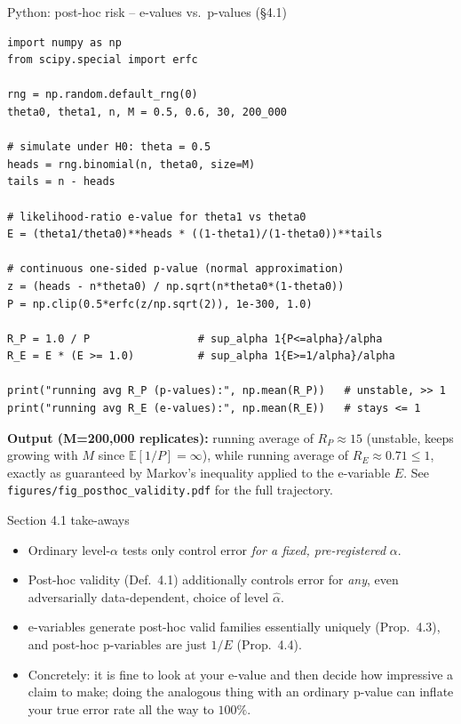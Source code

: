 \documentclass[aspectratio=169,10pt]{beamer}
\begin{document}
\begin{frame}[fragile]{Python: post-hoc risk -- e-values vs.\ p-values (\S4.1)}
\begin{lstlisting}
import numpy as np
from scipy.special import erfc

rng = np.random.default_rng(0)
theta0, theta1, n, M = 0.5, 0.6, 30, 200_000

# simulate under H0: theta = 0.5
heads = rng.binomial(n, theta0, size=M)
tails = n - heads

# likelihood-ratio e-value for theta1 vs theta0
E = (theta1/theta0)**heads * ((1-theta1)/(1-theta0))**tails

# continuous one-sided p-value (normal approximation)
z = (heads - n*theta0) / np.sqrt(n*theta0*(1-theta0))
P = np.clip(0.5*erfc(z/np.sqrt(2)), 1e-300, 1.0)

R_P = 1.0 / P                 # sup_alpha 1{P<=alpha}/alpha
R_E = E * (E >= 1.0)          # sup_alpha 1{E>=1/alpha}/alpha

print("running avg R_P (p-values):", np.mean(R_P))   # unstable, >> 1
print("running avg R_E (e-values):", np.mean(R_E))   # stays <= 1
\end{lstlisting}
  \textbf{Output (M=200{,}000 replicates):} running average of $R_P\approx 15$
  (unstable, keeps growing with $M$ since $\mathbb E[1/P]=\infty$), while
  running average of $R_E\approx 0.71 \le 1$, exactly as guaranteed by
  Markov's inequality applied to the e-variable $E$. See
  \texttt{figures/fig\_posthoc\_validity.pdf} for the full trajectory.
\end{frame}

\begin{frame}{Section 4.1 take-aways}
  \begin{itemize}
    \item Ordinary level-$\alpha$ tests only control error \emph{for a fixed,
    pre-registered} $\alpha$.
    \item Post-hoc validity (Def.\ 4.1) additionally controls error for
    \emph{any}, even adversarially data-dependent, choice of level $\hat\alpha$.
    \item e-variables generate post-hoc valid families essentially uniquely
    (Prop.\ 4.3), and post-hoc p-variables are just $1/E$ (Prop.\ 4.4).
    \item Concretely: it is fine to look at your e-value and then decide how
    impressive a claim to make; doing the analogous thing with an ordinary
    p-value can inflate your true error rate all the way to $100\%$.
  \end{itemize}
\end{frame}
\end{document}
